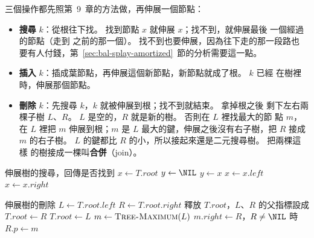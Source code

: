 三個操作都先照第~9~章的方法做，再伸展一個節點：

\begin{itemize}
\item \textbf{搜尋} $k$：從根往下找。 找到節點 $x$ 就伸展 $x$；找不到，就伸展最後
一個經過的節點（走到 \NIL 之前的那一個）。 找不到也要伸展，因為往下走的那一段路也
要有人付錢，第~\ref{sec:bal-splay-amortized}~節的分析需要這一點。
\item \textbf{插入} $k$：插成葉節點，再伸展這個新節點，新節點就成了根。 $k$ 已經
在樹裡時，伸展那個節點。
\item \textbf{刪除} $k$：先搜尋 $k$，$k$ 就被伸展到根；找不到就結束。 拿掉根之後
剩下左右兩棵子樹 $L$、$R$。 $L$ 是空的，$R$ 就是新的樹。 否則在 $L$ 裡找最大的節
點 $m$，在 $L$ 裡把 $m$ 伸展到根；$m$ 是 $L$ 最大的鍵，伸展之後沒有右子樹，把 $R$
接成 $m$ 的右子樹。 $L$ 的鍵都比 $R$ 的小，所以接起來還是二元搜尋樹。 把兩棵這樣
的樹接成一棵叫\textbf{合併}（join）。
\end{itemize}

\begin{pseudo}[unbreakable, label=alg:bal-splay-search]{伸展樹的搜尋，回傳是否找到}
    \State $x \gets T.\mathit{root}$
    \State $y \gets \NIL$ 
        \State $y \gets x$
            \State $x \gets x.\mathit{left}$
        \Else
            \State $x \gets x.\mathit{right}$
        \EndIf
    \EndWhile
        \State {}
        \State \Return \TRUE
    \EndIf
        \State {}
    \EndIf
    \State \Return \FALSE
\EndFunction
\end{pseudo}

\begin{pseudo}[unbreakable, label=alg:bal-splay-delete]{伸展樹的刪除}
        \State \Return {}
    \EndIf
    \State $L \gets T.\mathit{root}.\mathit{left}$
    \State $R \gets T.\mathit{root}.\mathit{right}$
    \State 釋放 $T.\mathit{root}$，$L$、$R$ 的父指標設成 \NIL
        \State $T.\mathit{root} \gets R$
    \Else
        \State $T.\mathit{root} \gets L$ 
        \State $m \gets \Call{Tree-Maximum}{L}$ 
        \State {} 
        \State $m.\mathit{right} \gets R$，$R \ne \NIL$ 時 $R.p \gets m$
    \EndIf
\EndProcedure
\end{pseudo}

